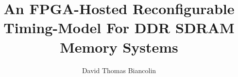 \documentclass[masters]{ucbthesis}
\begin{document}

\title{An FPGA-Hosted Reconfigurable Timing-Model For DDR SDRAM Memory Systems}
\author{David Thomas Biancolin}


\clearpage

\maketitle

%

\begin{frontmatter}


\setcounter{tocdepth}{2}
\setcounter{secnumdepth}{2}
\tableofcontents
\clearpage
\listoffigures
\clearpage
\listoftables

\begin{acknowledgements}
\end{acknowledgements}

\end{frontmatter}

\pagestyle{headings}

\end{document}
